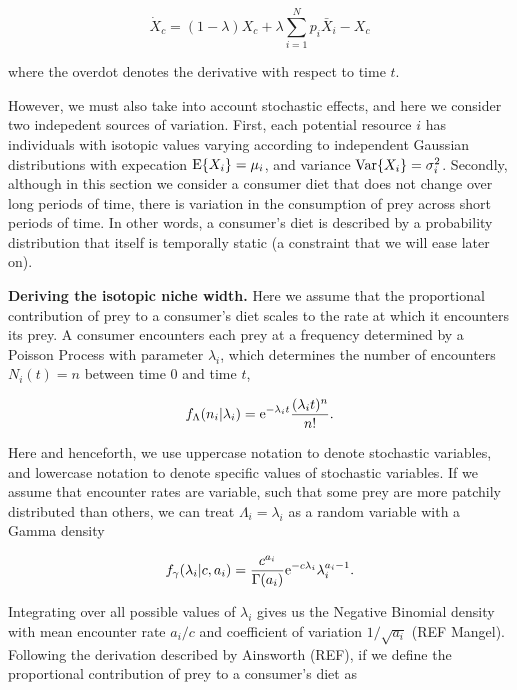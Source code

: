 \documentclass[11pt]{article}
\begin{document}
\begin{equation}
\label{eqODE}
\dot X_c = (1-\lambda)X_c + \lambda \sum_{i=1}^N p_i \bar{X}_i - X_c
\end{equation}

\noindent where the overdot denotes the derivative with respect to time $t$.

However, we must also take into account stochastic effects, and here we consider two indepedent sources of variation.
First, each potential resource $i$ has individuals with isotopic values varying according to independent Gaussian distributions with expecation ${\rm E}\{X_i\}=\mu_i$, and variance ${\rm Var}\{X_i\}=\sigma^2_i$.
Secondly, although in this section we consider a consumer diet that does not change over long periods of time, there is variation in the consumption of prey across short periods of time.
In other words, a consumer's diet is described by a probability distribution that itself is temporally static (a constraint that we will ease later on).

{\bf Deriving the isotopic niche width.} Here we assume that the proportional contribution of prey to a consumer's diet scales to the rate at which it encounters its prey.
A consumer encounters each prey at a frequency determined by a Poisson Process with parameter $\lambda_i$, which determines the number of encounters $N_i(t)=n$ between time 0 and time $t$,

\begin{equation}
f_\Lambda (n_i|\lambda_i) = {\rm e}^{-\lambda_i t}\frac{(\lambda_i t)^n}{n!}.
\end{equation}

\noindent Here and henceforth, we use uppercase notation to denote stochastic variables, and lowercase notation to denote specific values of stochastic variables.
If we assume that encounter rates are variable, such that some prey are more patchily distributed than others, we can treat $\Lambda_i = \lambda_i$ as a random variable with a Gamma density

\begin{equation}
f_\gamma (\lambda_i | c, a_i) = \frac{c^{a_i}}{\Gamma (a_i)}{\rm e}^{-c \lambda_i}\lambda_i^{a_i - 1}.
\end{equation}

\noindent Integrating over all possible values of $\lambda_i$ gives us the Negative Binomial density with mean encounter rate $a_i/c$ and coefficient of variation $1/\sqrt{a_i}$ (REF Mangel).
Following the derivation described by Ainsworth (REF), if we define the proportional contribution of prey to a consumer's diet as
\end{document}
